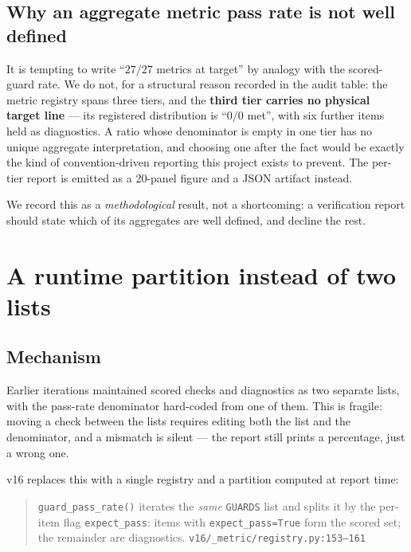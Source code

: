 \documentclass[11pt,a4paper]{article}
\newcommand{\code}[1]{\texttt{\small #1}}
\newcommand{\src}[1]{{\footnotesize\texttt{#1}}}
\begin{document}
\subsection{Why an aggregate metric pass rate is not well defined}
\label{sec:aggregate}

It is tempting to write ``$27/27$ metrics at target'' by analogy with the
scored-guard rate. We do not, for a structural reason recorded in the audit
table: the metric registry spans three tiers, and the \textbf{third tier
carries no physical target line} --- its registered distribution is ``$0/0$
met'', with six further items held as diagnostics. A ratio whose denominator is
empty in one tier has no unique aggregate interpretation, and choosing one after
the fact would be exactly the kind of convention-driven reporting this project
exists to prevent. The per-tier report is emitted as a 20-panel figure and a
JSON artifact instead.

We record this as a \emph{methodological} result, not a shortcoming: a
verification report should state which of its aggregates are well defined, and
decline the rest.

\section{A runtime partition instead of two lists}
\label{sec:split}

\subsection{Mechanism}

Earlier iterations maintained scored checks and diagnostics as two separate
lists, with the pass-rate denominator hard-coded from one of them. This is
fragile: moving a check between the lists requires editing both the list and
the denominator, and a mismatch is silent --- the report still prints a
percentage, just a wrong one.

v16 replaces this with a single registry and a partition computed at report
time:

\begin{quote}\small
\code{guard_pass_rate()} iterates the \emph{same} \code{GUARDS} list and splits
it by the per-item flag \code{expect_pass}: items with \code{expect_pass=True}
form the scored set; the remainder are diagnostics.
\hfill\src{v16/\_metric/registry.py:153--161}
\end{quote}
\end{document}
